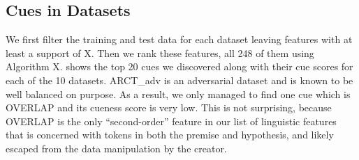 %
%
%
%
%
\subsection{Cues in Datasets}

We first filter the training and test data for each dataset leaving features with
at least a support of X. Then we rank these features, all 248 of them using Algorithm X.
 shows the top 20 cues we discovered along with their cue scores
for each of the 10 datasets. ARCT\_adv is an adversarial dataset
and is known to be well balanced on purpose. As a result, we only managed to find one cue
which is OVERLAP and its cueness score is very low. This is not surprising, because
OVERLAP is the only ``second-order'' feature in our list of linguistic features that
is concerned with tokens in both the premise and hypothesis, and likely escaped from
the data manipulation by the creator. 

